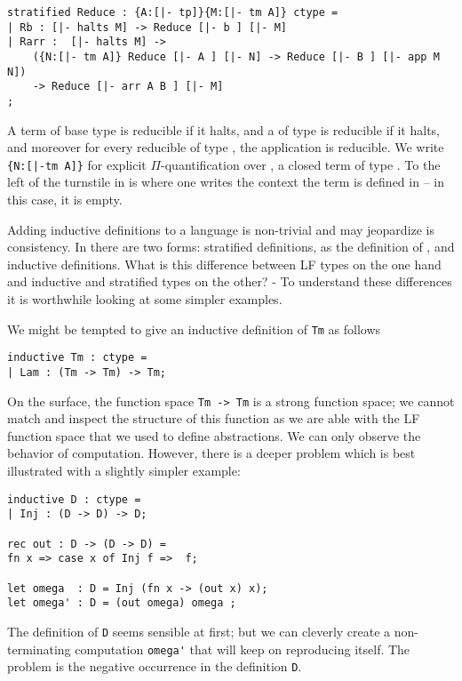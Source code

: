 \begin{lstlisting}
stratified Reduce : {A:[|- tp]}{M:[|- tm A]} ctype =
| Rb : [|- halts M] -> Reduce [|- b ] [|- M]
| Rarr :  [|- halts M] ->
    ({N:[|- tm A]} Reduce [|- A ] [|- N] -> Reduce [|- B ] [|- app M N])
    -> Reduce [|- arr A B ] [|- M]
;
\end{lstlisting}


A term of base type  is reducible if it halts, and a  of type
 is reducible if it halts, and moreover for every reducible
 of type , the application  is reducible. We write
\lstinline!{N:[|-tm A]}! for explicit $\Pi$-quantification over , a closed term
of type . To the left of the turnstile in \bel{[|- tm A]} is where one
writes the context the term is defined in -- in this case, it is empty.


Adding inductive definitions to a language is non-trivial and may
jeopardize is consistency. In \beluga there are two forms: stratified
definitions, as the definition of , and inductive definitions.
What is this difference between LF types on the one hand and inductive and
stratified types on the other? - To understand these differences it is
worthwhile looking at some simpler examples.

We might be tempted to give an inductive
definition of \texttt{Tm} as follows

\begin{lstlisting}
inductive Tm : ctype =
| Lam : (Tm -> Tm) -> Tm;
\end{lstlisting}

On the surface, the function space \verb+Tm -> Tm+
is a strong function space; we cannot match and inspect the structure
of this function as we are able with the LF function space that we
used to define abstractions. We can only observe the behavior of
computation. However, there is a deeper problem which is best
illustrated with a slightly simpler example:

\begin{lstlisting}
inductive D : ctype = 
| Inj : (D -> D) -> D;

rec out : D -> (D -> D) = 
fn x => case x of Inj f =>  f;

let omega  : D = Inj (fn x -> (out x) x);
let omega' : D = (out omega) omega ; 
\end{lstlisting}

The definition of \verb+D+ seems sensible at first; but we can
cleverly create a non-terminating computation \verb+omega'+ that
will keep on reproducing itself. The problem is the negative occurrence
in the definition \verb+D+. 


